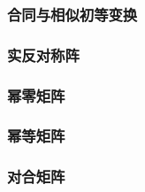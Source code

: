\documentclass[10pt,openany]{article}
\theoremstyle{thmstyle} %
\theoremstyle{defstyle} %
\theoremstyle{prostyle} %
\theoremstyle{exastyle}
\theoremstyle{remstyle}
\begin{document}
\subsubsection{合同与相似初等变换}


\subsubsection{实反对称阵}


\subsubsection{幂零矩阵}


\subsubsection{幂等矩阵}


\subsubsection{对合矩阵}
\end{document}
